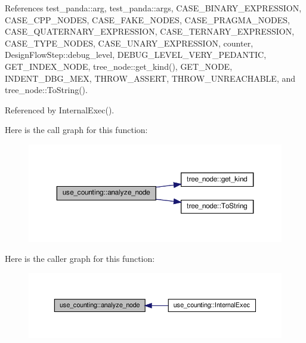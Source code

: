 References test\+\_\+panda\+::arg, test\+\_\+panda\+::args, C\+A\+S\+E\+\_\+\+B\+I\+N\+A\+R\+Y\+\_\+\+E\+X\+P\+R\+E\+S\+S\+I\+ON, C\+A\+S\+E\+\_\+\+C\+P\+P\+\_\+\+N\+O\+D\+ES, C\+A\+S\+E\+\_\+\+F\+A\+K\+E\+\_\+\+N\+O\+D\+ES, C\+A\+S\+E\+\_\+\+P\+R\+A\+G\+M\+A\+\_\+\+N\+O\+D\+ES, C\+A\+S\+E\+\_\+\+Q\+U\+A\+T\+E\+R\+N\+A\+R\+Y\+\_\+\+E\+X\+P\+R\+E\+S\+S\+I\+ON, C\+A\+S\+E\+\_\+\+T\+E\+R\+N\+A\+R\+Y\+\_\+\+E\+X\+P\+R\+E\+S\+S\+I\+ON, C\+A\+S\+E\+\_\+\+T\+Y\+P\+E\+\_\+\+N\+O\+D\+ES, C\+A\+S\+E\+\_\+\+U\+N\+A\+R\+Y\+\_\+\+E\+X\+P\+R\+E\+S\+S\+I\+ON, counter, Design\+Flow\+Step\+::debug\+\_\+level, D\+E\+B\+U\+G\+\_\+\+L\+E\+V\+E\+L\+\_\+\+V\+E\+R\+Y\+\_\+\+P\+E\+D\+A\+N\+T\+IC, G\+E\+T\+\_\+\+I\+N\+D\+E\+X\+\_\+\+N\+O\+DE, tree\+\_\+node\+::get\+\_\+kind(), G\+E\+T\+\_\+\+N\+O\+DE, I\+N\+D\+E\+N\+T\+\_\+\+D\+B\+G\+\_\+\+M\+EX, T\+H\+R\+O\+W\+\_\+\+A\+S\+S\+E\+RT, T\+H\+R\+O\+W\+\_\+\+U\+N\+R\+E\+A\+C\+H\+A\+B\+LE, and tree\+\_\+node\+::\+To\+String().



Referenced by Internal\+Exec().

Here is the call graph for this function\+:
\nopagebreak
\begin{figure}[H]
\begin{center}
\leavevmode
\includegraphics[width=350pt]{d4/d2e/classuse__counting_a7772a13ea271918f8f5d3136d73e05d7_cgraph}
\end{center}
\end{figure}
Here is the caller graph for this function\+:
\nopagebreak
\begin{figure}[H]
\begin{center}
\leavevmode
\includegraphics[width=350pt]{d4/d2e/classuse__counting_a7772a13ea271918f8f5d3136d73e05d7_icgraph}
\end{center}
\end{figure}
\mbox{\label{classuse__counting_a8a110f0d3c446c00cbdbe88a465e24d8}} 
